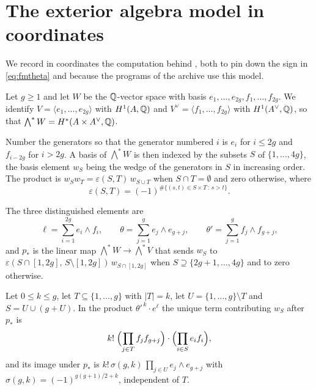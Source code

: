 \section{The exterior algebra model in coordinates}\label{app:exterior}

We record in coordinates the computation behind , both to
pin down the sign in \eqref{eq:fmtheta} and because the programs of the
archive \cite{Bha26} use this model.

Let $g\ge1$ and let $W$ be the $\mathbb{Q}$-vector space with basis
$e_{1},\dots,e_{2g},f_{1},\dots,f_{2g}$. We identify
$V=\langle e_{1},\dots,e_{2g}\rangle$ with $H^{1}(A,\mathbb{Q})$ and
$V^{\vee}=\langle f_{1},\dots,f_{2g}\rangle$ with $H^{1}(A^{\vee},\mathbb{Q})$, so that
$\bigwedge^{*}W=H^{*}(A\times A^{\vee},\mathbb{Q})$.

Number the generators so that the generator numbered $i$ is $e_{i}$ for
$i\le2g$ and $f_{i-2g}$ for $i>2g$. A basis of $\bigwedge^{*}W$ is then
indexed by the subsets $S$ of $\{1,\dots,4g\}$, the basis element $w_{S}$
being the wedge of the generators in $S$ in increasing order. The product
is $w_{S}w_{T}=\varepsilon(S,T)\,w_{S\cup T}$ when $S\cap T=\emptyset$ and zero
otherwise, where
\begin{equation}\label{eq:shufflesign}
  \varepsilon(S,T)=(-1)^{\#\{(s,t)\in S\times T\,:\,s>t\}} .
\end{equation}

The three distinguished elements are
\[
  \ell=\sum_{i=1}^{2g}e_{i}\wedge f_{i},
  \qquad
  \theta=\sum_{j=1}^{g}e_{j}\wedge e_{g+j},
  \qquad
  \theta'=\sum_{j=1}^{g}f_{j}\wedge f_{g+j},
\]
and $p_{*}$ is the linear map $\bigwedge^{*}W\to\bigwedge^{*}V$ that sends
$w_{S}$ to $\varepsilon(S\cap[1,2g],\,S\setminus[1,2g])\,w_{S\cap[1,2g]}$ when
$S\supseteq\{2g+1,\dots,4g\}$ and to zero otherwise.

\begin{lemma}\label{lem:appsign}
Let $0\le k\le g$, let $T\subseteq\{1,\dots,g\}$ with $|T|=k$, let
$U=\{1,\dots,g\}\setminus T$ and $S=U\cup(g+U)$. In the product
$\theta'^{\,k}\cdot e^{\ell}$ the unique term contributing $w_{S}$ after
$p_{*}$ is
\[
  k!\;\Bigl(\prod_{j\in T}f_{j}f_{g+j}\Bigr)\cdot\Bigl(\prod_{i\in S}e_{i}f_{i}\Bigr),
\]
and its image under $p_{*}$ is
$k!\,\sigma(g,k)\,\prod_{j\in U}e_{j}\wedge e_{g+j}$ with
$\sigma(g,k)=(-1)^{g(g+1)/2+k}$, independent of $T$.
\end{lemma}

